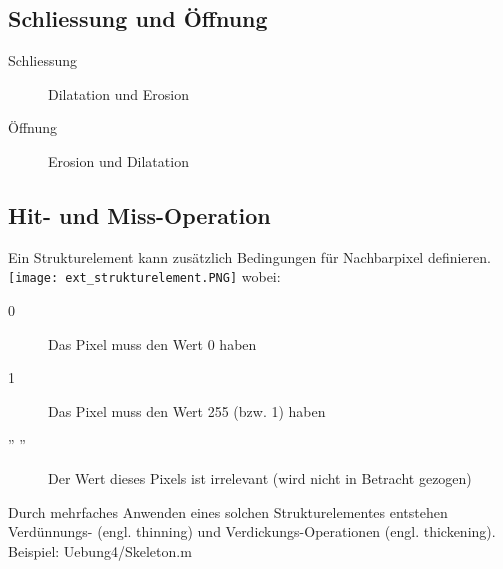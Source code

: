 \subsection{Schliessung und Öffnung}
\begin{description}
    \item[Schliessung] Dilatation und Erosion
    \item[Öffnung] Erosion und Dilatation
\end{description}

\subsection{Hit- und Miss-Operation}
Ein Strukturelement kann zusätzlich Bedingungen für Nachbarpixel definieren.
\texttt{[image: ext\_strukturelement.PNG]}
wobei:
\begin{description}
    \item[0] Das Pixel muss den Wert 0 haben
    \item[1] Das Pixel muss den Wert 255 (bzw. 1) haben
    \item['' ''] Der Wert dieses Pixels ist irrelevant (wird nicht in Betracht gezogen)
\end{description}
Durch mehrfaches Anwenden eines solchen Strukturelementes entstehen Verdünnungs- (engl. thinning) und Verdickungs-Operationen (engl. thickening).\\
Beispiel: Uebung4/Skeleton.m